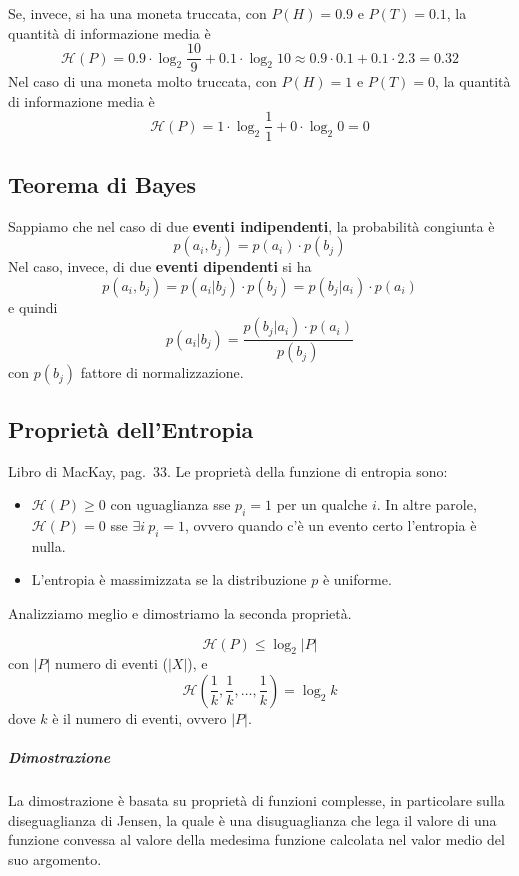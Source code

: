 Se, invece, si ha una moneta truccata, con $P(H)=0.9$ e $P(T)=0.1$, la quantità di informazione media è
$$
    \mathcal{H}(P) = 0.9\cdot\log_2\frac{10}{9} + 0.1\cdot\log_2 10 \approx 0.9\cdot 0.1 + 0.1\cdot 2.3 = 0.32
$$
Nel caso di una moneta molto truccata, con $P(H)=1$ e $P(T)=0$, la quantità di informazione media è
$$
    \mathcal{H}(P) = 1\cdot\log_2\frac{1}{1} + 0\cdot\log_2 0 = 0
$$


\subsection{Teorema di Bayes}
Sappiamo che nel caso di due \textbf{eventi indipendenti}, la probabilità congiunta è
$$
    p(a_i,b_j) = p(a_i)\cdot p(b_j)
$$
Nel caso, invece, di due \textbf{eventi dipendenti} si ha
$$
    p(a_i,b_j) = p(a_i|b_j)\cdot p(b_j) = p(b_j|a_i)\cdot p(a_i)
$$
e quindi
$$
p(a_i|b_j) = \dfrac{p(b_j|a_i)\cdot p(a_i)}{p(b_j)}
$$
con $p(b_j)$ fattore di normalizzazione.




\subsection{Proprietà dell'Entropia}
Libro di MacKay, pag.~33. Le proprietà della funzione di entropia sono:
\begin{itemize}
    \item $\mathcal{H}(P)\geq 0$ con uguaglianza sse $p_i=1$ per un qualche $i$. In altre parole, $\mathcal{H}(P)=0$ sse $\exists i ~p_i=1$, ovvero quando c'è un evento certo l'entropia è nulla.
    \item L'entropia è massimizzata se la distribuzione $p$ è uniforme.
\end{itemize}
Analizziamo meglio e dimostriamo la seconda proprietà.

\begin{property} 
    $$
        \mathcal{H}(P)\leq \log_2|P|
    $$
    con $|P|$ numero di eventi ($|X|$), e
    $$
        \mathcal{H}\left(\frac{1}{k},\frac{1}{k},\dots,\frac{1}{k}\right) = \log_2 k
    $$
    dove $k$ è il numero di eventi, ovvero $|P|$.
\end{property}

\subparagraph{Dimostrazione} La dimostrazione è basata su proprietà di funzioni complesse, in particolare sulla diseguaglianza di Jensen, la quale è una disuguaglianza che lega il valore di una funzione convessa al valore della medesima funzione calcolata nel valor medio del suo argomento.

